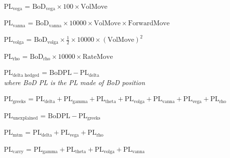 \documentclass{article}
\begin{document}
\vspace{1.5em}
\noindent \textbf{$\mathrm{PL}_{\text{vega}}$} = $\mathrm{BoD}_{\text{vega}} \times 100 \times \text{VolMove}$ \\
\textit{ }

\vspace{0.5em}
\noindent \textbf{$\mathrm{PL}_{\text{vanna}}$} = $\mathrm{BoD}_{\text{vanna}} \times 10000 \times \text{VolMove} \times \text{ForwardMove}$ \\
\textit{ }

\vspace{0.5em}
\noindent \textbf{$\mathrm{PL}_{\text{volga}}$} = $\mathrm{BoD}_{\text{volga}} \times \frac{1}{2} \times 10000 \times (\text{VolMove})^2$ \\
\textit{ }

\vspace{0.5em}
\noindent \textbf{$\mathrm{PL}_{\text{rho}}$} = $\mathrm{BoD}_{\text{rho}} \times 10000 \times \text{RateMove}$ \\
\textit{ }

\vspace{0.5em}
\noindent \textbf{$\mathrm{PL}_{\text{delta hedged}}$} = $\mathrm{BoDPL} - \mathrm{PL}_{\text{delta}}$ \\
\textit{where BoD PL is the PL made of BoD position}
\textit{ }

\vspace{1.5em}
\noindent \textbf{$\mathrm{PL}_{\text{greeks}}$} = $\mathrm{PL}_{\text{delta}} + \mathrm{PL}_{\text{gamma}} + \mathrm{PL}_{\text{theta}} + \mathrm{PL}_{\text{volga}} + \mathrm{PL}_{\text{vanna}} + \mathrm{PL}_{\text{vega}} + \mathrm{PL}_{\text{rho}}$ \\
\textit{ }

\vspace{0.5em}
\noindent \textbf{$\mathrm{PL}_{\text{unexplained}}$} = $\mathrm{BoDPL} - \mathrm{PL}_{\text{greeks}}$ \\
\textit{ }

\vspace{0.5em}
\noindent \textbf{$\mathrm{PL}_{\text{mtm}}$} = $\mathrm{PL}_{\text{delta}} + \mathrm{PL}_{\text{vega}} + \mathrm{PL}_{\text{rho}}$ \\
\textit{ }

\vspace{0.5em}
\noindent \textbf{$\mathrm{PL}_{\text{carry}}$} = $\mathrm{PL}_{\text{gamma}} + \mathrm{PL}_{\text{theta}} + \mathrm{PL}_{\text{volga}} + \mathrm{PL}_{\text{vanna}}$ \\
\textit{ }
\end{document}
